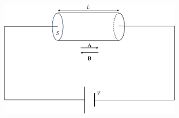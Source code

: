 \begin{figure}[htbp]
  \centering
  \includegraphics[width=0.8\textwidth]{../graphs/jumon_111.png}
  \caption{}
\end{figure}


